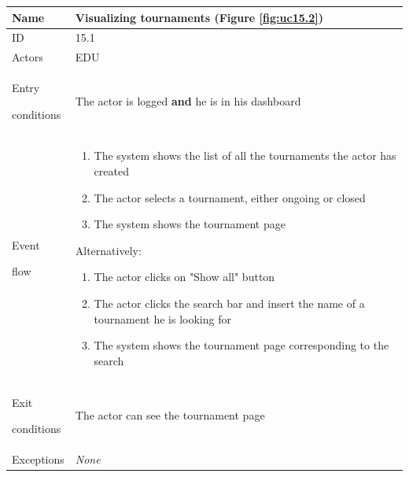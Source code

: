 \begin{center}
    \def\arraystretch{1.5}
    \begin{tabular}{| m{2cm} | m{10cm}|}
        \hline
        Name                  & Visualizing tournaments (Figure \ref{fig:uc15.2})                                                    \\ \hline
        ID                    & 15.1                                                                        \\ \hline
        Actors                & EDU                                                                         \\ \hline
        Entry \par conditions & The actor is logged \textbf{and} he is in his dashboard                     \\ \hline
        Event \par flow       & \begin{enumerate}
                                    \item The system shows the list of all the tournaments the actor has created
                                    \item The actor selects a tournament, either ongoing or closed
                                    \item The system shows the tournament page
                                \end{enumerate}
        Alternatively:
        \begin{enumerate}
            \item The actor clicks on "Show all" button
            \item The actor clicks the search bar and insert the name of a tournament he is looking for
            \item The system shows the tournament page corresponding to the search
        \end{enumerate}          \\ \hline
        Exit \par conditions  & The actor can see the tournament page                                       \\ \hline
        Exceptions            & \textit{None}                                                               \\ \hline
    \end{tabular}
\end{center}


